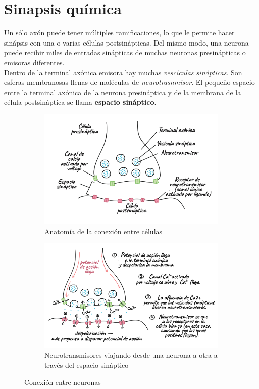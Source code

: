 \section{Sinapsis química}\label{sec:sinapsis_quimica}
Un sólo axón puede tener múltiples ramificaciones, lo que le permite hacer sinápsis con una o varias células postsinápticas. Del mismo modo, una neurona puede recibir miles de entradas sinápticas de muchas neuronas presinápticas o emisoras diferentes.\\
Dentro de la terminal axónica emisora hay muchas \textit{vescículas sinápticas}. Son esferas membranosas llenas de moléculas de \textit{neurotrasnmisor}. El pequeño espacio entre la terminal axónica de la neurona presináptica y de la membrana de la célula postsináptica se llama \textbf{espacio sináptico}.
\begin{figure}[h!]
        \centering
        \begin{subfigure}[b]{0.475\textwidth}
            \centering
            \includegraphics[width=\textwidth]{figures/conexion_neuronas.png}
            \caption{Anatomía de la conexión entre células}
            \label{fig:anatomia_conexion}
        \end{subfigure}
        \hfill
        \begin{subfigure}[b]{0.475\textwidth}  
            \centering 
            \includegraphics[width=\textwidth]{figures/neurotransmisores.png}
            \caption{Neurotransmisores viajando desde una neurona a otra a través del espacio sináptico}
            \label{fig:neurotransmisores}
        \end{subfigure}
        \quad
        \caption{Conexión entre neuronas}
        \label{fig:conexion_neuronas}
\end{figure}
